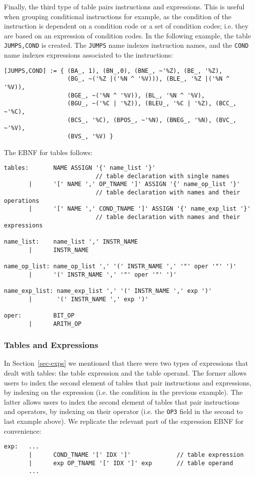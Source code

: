 Finally, the third type of table pairs instructions and expressions.
This is useful when grouping conditional instructions for example,
as the condition of the instruction is dependent on a condition code
or a set of condition codes; i.e. they are based on an expression of
condition codes.  
In the following example, the table \texttt{JUMPS,COND} is created. 
The \texttt{JUMPS} name indexes instruction names, and the \texttt{COND} 
name indexes expressions associated to the instructions:
\begin{verbatim}
[JUMPS,COND] := { (BA_, 1), (BN_,0), (BNE_, ~'%Z), (BE_, '%Z),
                  (BG_, ~('%Z |('%N ^ '%V))), (BLE_, '%Z |('%N ^ '%V)),
                  (BGE_, ~('%N ^ '%V)), (BL_, '%N ^ '%V),
                  (BGU_, ~('%C | '%Z)), (BLEU_, '%C | '%Z), (BCC_, ~'%C),
                  (BCS_, '%C), (BPOS_, ~'%N), (BNEG_, '%N), (BVC_, ~'%V),
                  (BVS_, '%V) }
\end{verbatim}

The EBNF for tables follows:
{\small
\begin{verbatim}
tables:       NAME ASSIGN '{' name_list '}'
                          // table declaration with single names
       |      '[' NAME ',' OP_TNAME ']' ASSIGN '{' name_op_list '}'
                          // table declaration with names and their operations
       |      '[' NAME ',' COND_TNAME ']' ASSIGN '{' name_exp_list '}'
                          // table declaration with names and their expressions

name_list:    name_list ',' INSTR_NAME
       |      INSTR_NAME

name_op_list: name_op_list ',' '(' INSTR_NAME ',' '"' oper '"' ')'
       |      '(' INSTR_NAME ',' '"' oper '"' ')'

name_exp_list: name_exp_list ',' '(' INSTR_NAME ',' exp ')'
       |       '(' INSTR_NAME ',' exp ')'

oper:         BIT_OP
       |      ARITH_OP
\end{verbatim}
}


\subsubsection{Tables and Expressions}
\label{sec-tab-and-exps}
In Section~\ref{sec-exps} we mentioned that there were two types
of expressions that dealt with tables: the table expression and 
the table operand.  The former allows users to index the second element
of tables that pair instructions and expressions, by indexing on the 
expression (i.e. the condition in the previous example).  The latter 
allows users to index the second element of tables that pair instructions
and operators, by indexing on their operator (i.e. the \texttt{OP3} 
field in the second to last example above). 
We replicate the relevant part of the expression EBNF for convenience: 
{\small
\begin{verbatim}
exp:   ...
       |      COND_TNAME '[' IDX ']'             // table expression
       |      exp OP_TNAME '[' IDX ']' exp       // table operand
       ...
\end{verbatim}
}

